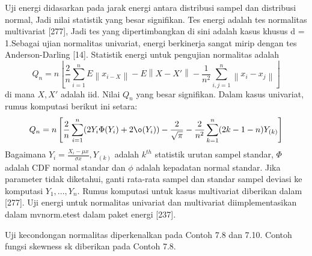 \documentclass[a4paper,12pt]{article}
\theoremstyle{definition}
\begin{document}
Uji energi didasarkan pada jarak energi antara distribusi sampel dan distribusi normal, Jadi nilai statistik yang besar signifikan. Tes energi adalah tes normalitas multivariat [277], Jadi tes yang dipertimbangkan di sini adalah kasus khusus d = 1.Sebagai ujian normalitas univariat, energi berkinerja sangat mirip dengan tes Anderson-Darling [14]. Statistik energi
untuk pengujian normalitas adalah 
\begin{equation}
    Q_{n}=n\left\lfloor\frac{2}{n}\sum_{i=1}^{n}E\left\| x_{i-X}\right\|-E\left\| X-{X}'\right\|-\frac{1}{n^{2}}\sum_{i,j=1}^{n}\left\| x_{i}-x_{j}\right\|\right \rfloor
\end{equation}
di mana $X,{X}'$ adalah iid. Nilai $Q_{n}$ yang besar signifikan. Dalam kasus univariat, rumus komputasi berikut ini setara:
\begin{equation}
    Q_{n}=n\left [ \frac{2}{n}\sum_{i=1}^{n}(2Y_{i}\Phi(Y_{i})+2\o(Y_{i}))-\frac{2}{\sqrt{\pi}}-\frac{2}{n^{2}}\sum_{k=1}^{n}(2k-1-n)Y_{(k)} \right ]
\end{equation}
Bagaimana $Y_{i} = \frac{X_{i}-\mu x}{\sigma x}, Y_{(k)}$ adalah $k^{th}$ statistik urutan sampel standar, $\Phi $ adalah CDF normal standar dan $\phi$ adalah kepadatan normal standar. Jika parameter tidak diketahui, ganti rata-rata sampel dan standar sampel deviasi ke komputasi $Y_{1},...,Y_{n}$. Rumus komputasi untuk kasus multivariat diberikan dalam [277]. Uji energi untuk normalitas univariat dan multivariat diimplementasikan dalam mvnorm.etest dalam paket energi [237].

Uji kecondongan normalitas diperkenalkan pada Contoh 7.8 dan 7.10.
Contoh fungsi skewness sk diberikan pada Contoh 7.8. 
\end{document}
